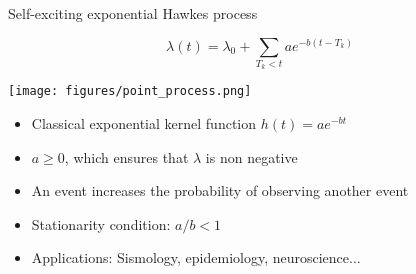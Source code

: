 \documentclass[french,english]{beamer}
\begin{document}
\begin{frame}{Self-exciting exponential Hawkes process}


$$ \lambda(t)= \lambda_0 + \underset{T_k < t}{\sum} a e^{-b(t-T_k)}$$



\begin{minipage}{5.6cm}

\vspace{1cm}
\texttt{[image: figures/point\_process.png]} \\


\end{minipage}
\begin{minipage}{5cm}
\begin{alertblock}{}
\small
\begin{itemize}
\item Classical exponential kernel function $h(t)= a e^{-b t}$
\item $ a \geq 0$, which ensures that $\lambda$ is non negative 
\item An event increases the probability of observing another event
\item Stationarity condition: $a/b <1$
\item Applications: Sismology, epidemiology, neuroscience...

\end{itemize}
\end{alertblock}

\end{minipage}

%
\end{frame}
\end{document}
